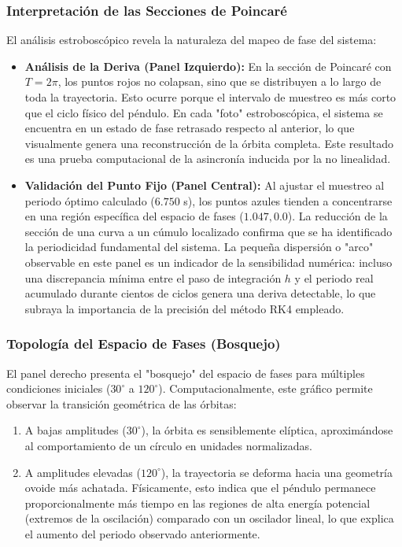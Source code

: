 \subsubsection{Interpretación de las Secciones de Poincaré}

El análisis estroboscópico revela la naturaleza del mapeo de fase del sistema:

\begin{itemize}
    \item \textbf{Análisis de la Deriva (Panel Izquierdo):} En la sección de Poincaré con $T = 2\pi$, los puntos rojos no colapsan, sino que se distribuyen a lo largo de toda la trayectoria. Esto ocurre porque el intervalo de muestreo es más corto que el ciclo físico del péndulo. En cada "foto" estroboscópica, el sistema se encuentra en un estado de fase retrasado respecto al anterior, lo que visualmente genera una reconstrucción de la órbita completa. Este resultado es una prueba computacional de la asincronía inducida por la no linealidad.
    \item \textbf{Validación del Punto Fijo (Panel Central):} Al ajustar el muestreo al periodo óptimo calculado ($6.750$ s), los puntos azules tienden a concentrarse en una región específica del espacio de fases ($1.047, 0.0$). La reducción de la sección de una curva a un cúmulo localizado confirma que se ha identificado la periodicidad fundamental del sistema. La pequeña dispersión o "arco" observable en este panel es un indicador de la sensibilidad numérica: incluso una discrepancia mínima entre el paso de integración $h$ y el periodo real acumulado durante cientos de ciclos genera una deriva detectable, lo que subraya la importancia de la precisión del método RK4 empleado.
\end{itemize}

\subsubsection{Topología del Espacio de Fases (Bosquejo)}

El panel derecho presenta el "bosquejo" del espacio de fases para múltiples condiciones iniciales ($30^\circ$ a $120^\circ$). Computacionalmente, este gráfico permite observar la transición geométrica de las órbitas:
\begin{enumerate}
    \item A bajas amplitudes ($30^\circ$), la órbita es sensiblemente elíptica, aproximándose al comportamiento de un círculo en unidades normalizadas.
    \item A amplitudes elevadas ($120^\circ$), la trayectoria se deforma hacia una geometría ovoide más achatada. Físicamente, esto indica que el péndulo permanece proporcionalmente más tiempo en las regiones de alta energía potencial (extremos de la oscilación) comparado con un oscilador lineal, lo que explica el aumento del periodo observado anteriormente.
\end{enumerate}

